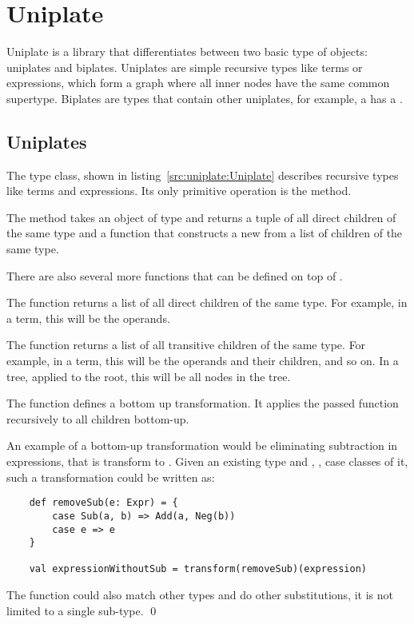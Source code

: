 \section{Uniplate}

Uniplate is a library that differentiates between two basic type of
objects: uniplates and biplates. Uniplates are simple recursive types
like terms or expressions, which form a graph where all inner nodes have
the same common supertype. Biplates are types that contain other uniplates,
for example, a  has a .

\subsection{Uniplates}
The  type class, shown in listing~\ref{src:uniplate:Uniplate}
describes recursive types like terms and expressions. Its only primitive
operation is the  method.



The  method takes an object of type  and returns a tuple
of all direct children of the same type and a function that constructs a new 
from a list of children of the same type.

There are also several more functions that can be defined on top of .

The  function returns a list of all direct children of the same
type. For example, in a term, this will be the operands.

The  function returns a list of all transitive children of the
same type. For example, in a term, this will be the operands and their children,
and so on. In a tree, applied to the root, this will be all nodes in the tree.

The  function defines a bottom up transformation. It applies
the passed function recursively to all children bottom-up.

\begin{example}[Transformation]
An example of a bottom-up transformation would be eliminating subtraction in expressions, that
is transform  to . Given an existing type 
and , ,  case classes of it, such a transformation
could be written as:

\begin{lstlisting}
    def removeSub(e: Expr) = {
        case Sub(a, b) => Add(a, Neg(b))
        case e => e
    }

    val expressionWithoutSub = transform(removeSub)(expression)
\end{lstlisting}
The function  could also match other types and do other substitutions,
it is not limited to a single sub-type. \qed
\end{example}

